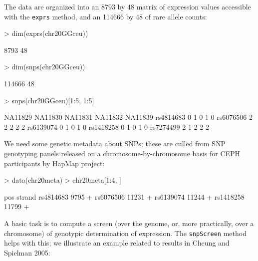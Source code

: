 \documentclass[12pt]{article}
\newcommand{\Rfunction}[1]{{\texttt{#1}}}
\begin{document}
The data are organized into an 8793
by 48 matrix of expression values
accessible with the \texttt{exprs} method, and
an 114666 by 48
of rare allele counts:
\begin{Schunk}
\begin{Sinput}
> dim(exprs(chr20GGceu))
\end{Sinput}
\begin{Soutput}
[1] 8793   48
\end{Soutput}
\begin{Sinput}
> dim(snps(chr20GGceu))
\end{Sinput}
\begin{Soutput}
[1] 114666     48
\end{Soutput}
\begin{Sinput}
> snps(chr20GGceu)[1:5, 1:5]
\end{Sinput}
\begin{Soutput}
          NA11829 NA11830 NA11831 NA11832 NA11839
rs4814683       0       1       0       1       0
rs6076506       2       2       2       2       2
rs6139074       0       1       0       1       0
rs1418258       0       1       0       1       0
rs7274499       2       1       2       2       2
\end{Soutput}
\end{Schunk}

We need some genetic metadata about SNPs; these are
culled from SNP genotyping panels released on a 
chromosome-by-chromosome basis for CEPH participants
by HapMap project:
\begin{Schunk}
\begin{Sinput}
> data(chr20meta)
> chr20meta[1:4, ]
\end{Sinput}
\begin{Soutput}
            pos strand
rs4814683  9795      +
rs6076506 11231      +
rs6139074 11244      +
rs1418258 11799      +
\end{Soutput}
\end{Schunk}

A basic task is to compute a screen (over the genome, or,
more practically, over a chromosome) of genotypic determination
of expression.  The \Rfunction{snpScreen} method helps
with this; we illustrate an example related to
results in Cheung and Spielman 2005:
\end{document}
